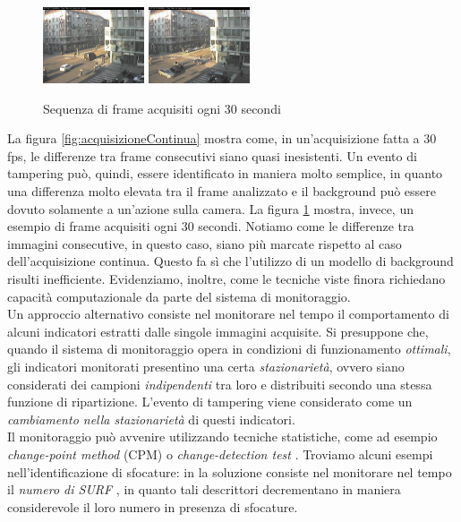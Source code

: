 \begin{figure}
	\includegraphics[width = 3cm]{./pictures/FPSbasso/image2697}
	\includegraphics[width = 3cm]{./pictures/FPSbasso/image2698}
	\caption{Sequenza di frame acquisiti ogni 30 secondi}
	\label{fig:acquisizioneBassa}
\end{figure}
La figura \ref{fig:acquisizioneContinua} mostra come, in un'acquisizione fatta a 30 fps, le differenze tra frame consecutivi siano quasi inesistenti. 
Un evento di tampering pu\`o, quindi, essere identificato in maniera molto semplice, in quanto una differenza molto elevata tra il frame analizzato e il background pu\`o essere dovuto solamente a un'azione sulla camera.
La figura \ref{fig:acquisizioneBassa} mostra, invece, un esempio di frame acquisiti ogni 30 secondi.
Notiamo come le differenze tra immagini consecutive, in questo caso, siano pi\`u marcate rispetto al caso dell'acquisizione continua. 
Questo fa s\`i che l'utilizzo di un modello di background risulti inefficiente.
Evidenziamo, inoltre, come le tecniche viste finora richiedano capacit\`a computazionale da parte del sistema di monitoraggio.\\
Un approccio alternativo consiste nel monitorare nel tempo il comportamento di alcuni indicatori estratti dalle singole immagini acquisite.
Si presuppone che, quando il sistema di monitoraggio opera in condizioni di funzionamento \textit{ottimali}, gli indicatori monitorati presentino una certa \textit{stazionariet\`a}, ovvero siano considerati dei campioni \textit{indipendenti} tra loro e distribuiti secondo una stessa funzione di ripartizione.
L'evento di tampering viene considerato come un \textit{cambiamento nella stazionariet\`a} di questi indicatori.\\
Il monitoraggio pu\`o avvenire utilizzando tecniche statistiche, come ad esempio \textit{change-point method} (CPM) \cite{ross2011nonparametric} o \textit{change-detection test} \cite{pimentel2014review}.
Troviamo alcuni esempi nell'identificazione di sfocature: in \cite{tsesmelis2013tamper} la soluzione consiste nel monitorare nel tempo il \textit{numero di SURF} \cite{bay2006surf}, in quanto tali descrittori decrementano in maniera considerevole il loro numero in presenza di sfocature.
